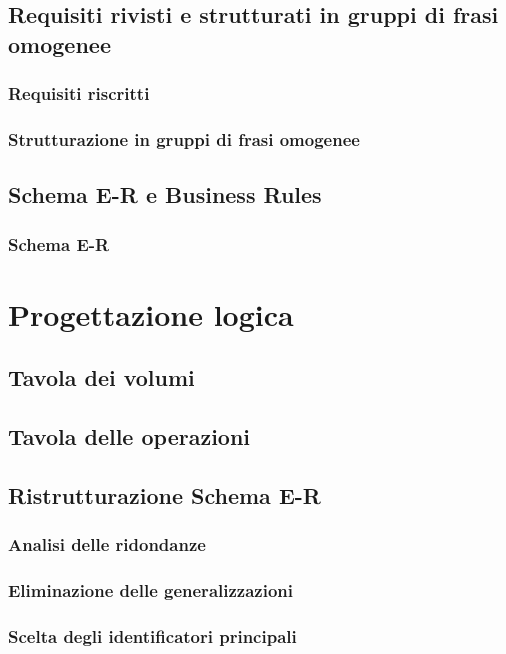 \documentclass[12pt]{extarticle}
\begin{document}
\subsection{Requisiti rivisti e strutturati in gruppi di frasi omogenee}

\subsubsection{Requisiti riscritti}
\subsubsection{Strutturazione in gruppi di frasi omogenee}

\subsection{Schema E-R e Business Rules}
\subsubsection{Schema E-R}


\section{Progettazione logica}
\subsection{Tavola dei volumi}

\subsection{Tavola delle operazioni}

\subsection{Ristrutturazione Schema E-R}
\subsubsection{Analisi delle ridondanze}
\subsubsection{Eliminazione delle generalizzazioni}
\subsubsection{Scelta degli identificatori principali}
\end{document}
